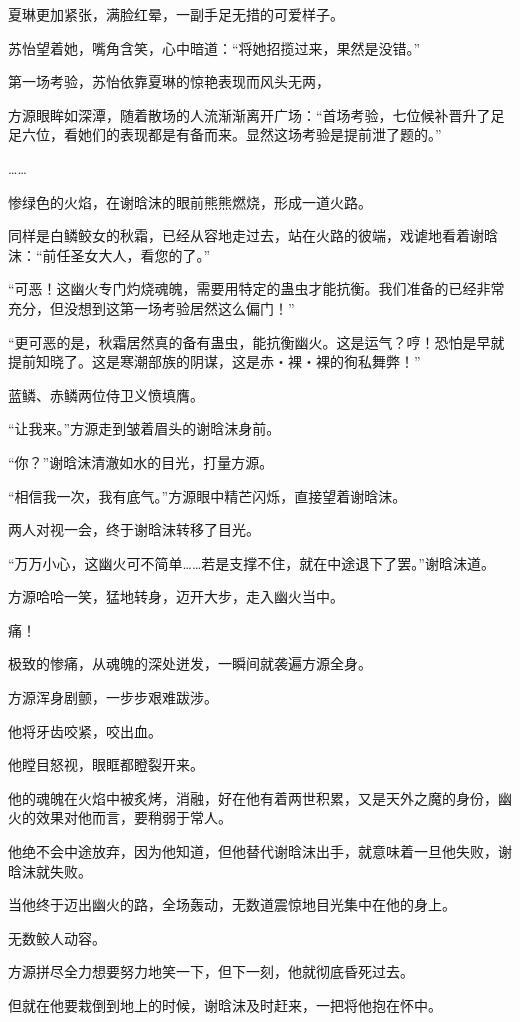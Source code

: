 \begin{this_body}
夏琳更加紧张，满脸红晕，一副手足无措的可爱样子。

苏怡望着她，嘴角含笑，心中暗道：“将她招揽过来，果然是没错。”

第一场考验，苏怡依靠夏琳的惊艳表现而风头无两，

方源眼眸如深潭，随着散场的人流渐渐离开广场：“首场考验，七位候补晋升了足足六位，看她们的表现都是有备而来。显然这场考验是提前泄了题的。”

……

惨绿色的火焰，在谢晗沫的眼前熊熊燃烧，形成一道火路。

同样是白鳞鲛女的秋霜，已经从容地走过去，站在火路的彼端，戏谑地看着谢晗沫：“前任圣女大人，看您的了。”

“可恶！这幽火专门灼烧魂魄，需要用特定的蛊虫才能抗衡。我们准备的已经非常充分，但没想到这第一场考验居然这么偏门！”

“更可恶的是，秋霜居然真的备有蛊虫，能抗衡幽火。这是运气？哼！恐怕是早就提前知晓了。这是寒潮部族的阴谋，这是赤・裸・裸的徇私舞弊！”

蓝鳞、赤鳞两位侍卫义愤填膺。

“让我来。”方源走到皱着眉头的谢晗沫身前。

“你？”谢晗沫清澈如水的目光，打量方源。

“相信我一次，我有底气。”方源眼中精芒闪烁，直接望着谢晗沫。

两人对视一会，终于谢晗沫转移了目光。

“万万小心，这幽火可不简单……若是支撑不住，就在中途退下了罢。”谢晗沫道。

方源哈哈一笑，猛地转身，迈开大步，走入幽火当中。

痛！

极致的惨痛，从魂魄的深处迸发，一瞬间就袭遍方源全身。

方源浑身剧颤，一步步艰难跋涉。

他将牙齿咬紧，咬出血。

他瞠目怒视，眼眶都瞪裂开来。

他的魂魄在火焰中被炙烤，消融，好在他有着两世积累，又是天外之魔的身份，幽火的效果对他而言，要稍弱于常人。

他绝不会中途放弃，因为他知道，但他替代谢晗沫出手，就意味着一旦他失败，谢晗沫就失败。

当他终于迈出幽火的路，全场轰动，无数道震惊地目光集中在他的身上。

无数鲛人动容。

方源拼尽全力想要努力地笑一下，但下一刻，他就彻底昏死过去。

但就在他要栽倒到地上的时候，谢晗沫及时赶来，一把将他抱在怀中。


\end{this_body}
